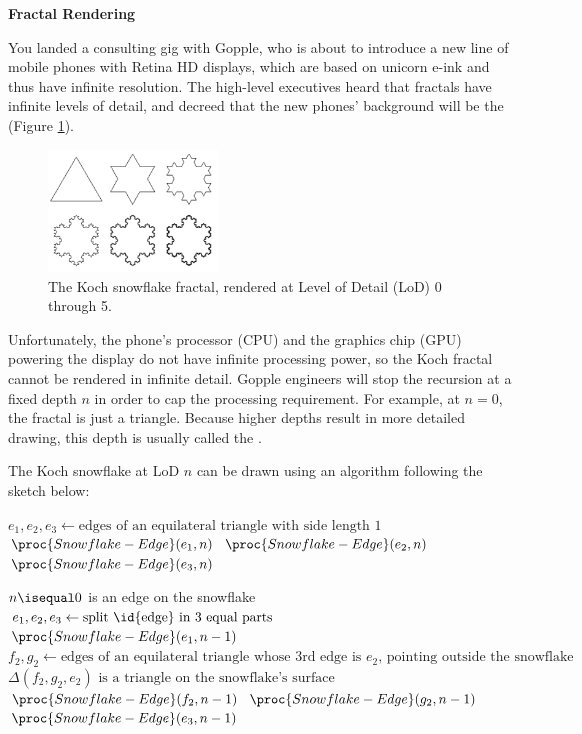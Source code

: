 \documentclass[12pt,twoside]{article}
\begin{document}
\begin{problems}

	\problem {} \textbf{Fractal Rendering}

	You landed a consulting gig with Gopple, who is about to introduce a new line
	of mobile phones with Retina HD displays, which are based on unicorn e-ink and thus
	have infinite resolution. The high-level executives heard that fractals have
	infinite levels of detail, and decreed that the new phones' background will be
	the   (Figure \ref{fig:snowflake}).

	\begin{figure}[htbp]
		\centering
		\includegraphics[width=0.4\textwidth]{figures/snowflake.pdf}
		\caption{The Koch snowflake fractal, rendered at Level of Detail (LoD) 0 through 5.}
		\label{fig:snowflake}
	\end{figure}

	Unfortunately, the phone's processor (CPU) and the graphics chip (GPU) powering
	the display do not have infinite processing power, so the Koch fractal cannot be
	rendered in infinite detail. Gopple engineers will stop the recursion at a
	fixed depth $n$ in order to cap the processing requirement.
	For example, at $n=0$, the fractal is just a triangle.
	Because higher depths result in more detailed drawing, this depth is usually
	called the .

	The Koch snowflake at LoD $n$ can be drawn using an algorithm following the
	sketch below:

	\begin{codebox}
		\li $e_1, e_2, e_3 \gets
			\textrm{edges of an equilateral triangle with side length }1$
		\li $\proc{Snowflake-Edge}(e_1, n)$
		\li $\proc{Snowflake-Edge}(e_2, n)$
		\li $\proc{Snowflake-Edge}(e_3, n)$
	\end{codebox}

	\begin{codebox}
		\Procname{$\proc{Snowflake-Edge}(\id{edge}, n)$}
		\li \If $n \isequal 0$
		\li   \Then \textrm{ is an edge on the snowflake}
		\li \Else
		\li   $e_1, e_2, e_3 \gets \textrm{split \id{edge} in 3 equal parts}$
		\li   $\proc{Snowflake-Edge}(e_1, n - 1)$
		\li   $f_2, g_2 \gets \textrm{edges of an equilateral triangle whose 3rd edge
				is } e_2 \textrm{, pointing outside the snowflake}$
		\li   $\textrm{$\Delta(f_2,g_2,e_2)$ is a triangle on the snowflake's surface}$
		\li   $\proc{Snowflake-Edge}(f_2, n - 1)$
		\li   $\proc{Snowflake-Edge}(g_2, n - 1)$
		\li   $\proc{Snowflake-Edge}(e_3, n - 1)$
		\End
	\end{codebox}


\end{problems}
\end{document}
